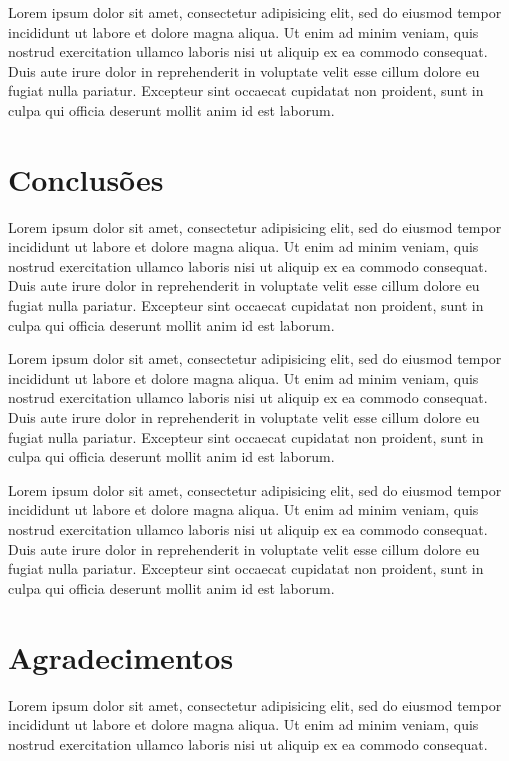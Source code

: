 \documentclass[a4paper, twocolumn, 11pt, twoside]{article}
\begin{document}
Lorem ipsum dolor sit amet, consectetur adipisicing elit, sed do eiusmod
tempor incididunt ut labore et dolore magna aliqua. Ut enim ad minim
veniam, quis nostrud exercitation ullamco laboris nisi ut aliquip ex ea
commodo consequat. Duis aute irure dolor in reprehenderit in voluptate
velit esse cillum dolore eu fugiat nulla pariatur. Excepteur sint
occaecat cupidatat non proident, sunt in culpa qui officia deserunt
mollit anim id est laborum.

\section{Conclusões}

Lorem ipsum dolor sit amet, consectetur adipisicing elit, sed do eiusmod
tempor incididunt ut labore et dolore magna aliqua. Ut enim ad minim
veniam, quis nostrud exercitation ullamco laboris nisi ut aliquip ex ea
commodo consequat. Duis aute irure dolor in reprehenderit in voluptate
velit esse cillum dolore eu fugiat nulla pariatur. Excepteur sint
occaecat cupidatat non proident, sunt in culpa qui officia deserunt
mollit anim id est laborum.

Lorem ipsum dolor sit amet, consectetur adipisicing elit, sed do eiusmod
tempor incididunt ut labore et dolore magna aliqua. Ut enim ad minim
veniam, quis nostrud exercitation ullamco laboris nisi ut aliquip ex ea
commodo consequat. Duis aute irure dolor in reprehenderit in voluptate
velit esse cillum dolore eu fugiat nulla pariatur. Excepteur sint
occaecat cupidatat non proident, sunt in culpa qui officia deserunt
mollit anim id est laborum.

Lorem ipsum dolor sit amet, consectetur adipisicing elit, sed do eiusmod
tempor incididunt ut labore et dolore magna aliqua. Ut enim ad minim
veniam, quis nostrud exercitation ullamco laboris nisi ut aliquip ex ea
commodo consequat. Duis aute irure dolor in reprehenderit in voluptate
velit esse cillum dolore eu fugiat nulla pariatur. Excepteur sint
occaecat cupidatat non proident, sunt in culpa qui officia deserunt
mollit anim id est laborum.

\section*{Agradecimentos}

Lorem ipsum dolor sit amet, consectetur adipisicing elit, sed do eiusmod
tempor incididunt ut labore et dolore magna aliqua. Ut enim ad minim
veniam, quis nostrud exercitation ullamco laboris nisi ut aliquip ex ea
commodo consequat.







\end{document}
